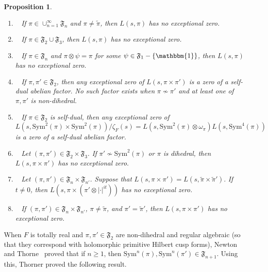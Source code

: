 \documentclass[11pt]{amsart}
\newtheorem{proposition}[theorem]{Proposition}
\theoremstyle{remark}
\newcommand{\Sym}{\mathrm{Sym}}
\renewcommand{\tilde}{\widetilde}
\numberwithin{equation}{section}
\begin{document}
\begin{proposition}
\label{prop:list}
\begin{enumerate}[leftmargin=*]
	\item~\cite{HoffsteinRamakrishnan,Wattanawanichkul} If $\pi\in\cup_{n=1}^{\infty}\mathfrak{F}_{n}$ and $\pi\neq \tilde{\pi}$, then $L(s,\pi)$ has no exceptional zero.
	\item~\cite{Banks,HoffsteinRamakrishnan} If $\pi\in\mathfrak{F}_{2}\cup \mathfrak{F}_{3}$, then $L(s,\pi)$ has no exceptional zero.
	\item~\cite{Luo} If $\pi\in\mathfrak{F}_n$ and $\pi\otimes\psi=\pi$ for some $\psi\in\mathfrak{F}_1-\{\mathbbm{1}\}$, then $L(s,\pi)$ has no exceptional zero.
	\item~\cite{RamakrishnanWang} If $\pi,\pi'\in\mathfrak{F}_{2}$, then any exceptional zero of $L(s,\pi\times\pi')$ is a zero of a self-dual abelian factor.  No such factor exists when $\pi\not\sim\pi'$ and at least one of $\pi,\pi'$ is non-dihedral.
	\item~\cite{RamakrishnanWang} If $\pi\in\mathfrak{F}_{2}$ is self-dual, then any exceptional zero of $L(s,\mathrm{Sym}^2(\pi)\times\mathrm{Sym}^2(\pi))/\zeta_F(s)=L(s,\mathrm{Sym}^2(\pi)\otimes\omega_{\pi})L(s,\mathrm{Sym}^4(\pi))$ is a zero of a self-dual abelian factor.
	\item~\cite{Luo} Let $(\pi,\pi')\in\mathfrak{F}_2\times\mathfrak{F}_3$.  If $\pi'\not\sim\Sym^2(\pi)$ or $\pi$ is dihedral, then $L(s,\pi\times\pi')$ has no exceptional zero.
	\item~\cite{HumphriesThorner,Wattanawanichkul} Let $(\pi,\pi')\in\mathfrak{F}_n\times\mathfrak{F}_{n'}$.  Suppose that $L(s,\pi\times\pi')=L(s,\tilde{\pi}\times\tilde{\pi}')$.  If $t\neq 0$, then $L(s,\pi\times(\pi'\otimes|\cdot|^{it}))$ has no exceptional zero.
	\item~\cite{Humphries,Wattanawanichkul} If $(\pi,\pi')\in\mathfrak{F}_n\times\mathfrak{F}_{n'}$, $\pi\neq\tilde{\pi}$, and $\pi'=\tilde{\pi}'$, then $L(s,\pi\times\pi')$ has no exceptional zero.
\end{enumerate}
\end{proposition}




When $F$ is totally real and $\pi,\pi'\in\mathfrak{F}_2$ are non-dihedral and regular algebraic (so that they correspond with holomorphic primitive Hilbert cusp forms), Newton and Thorne~\cite{NewtonThorne3,NewtonThorne,NewtonThorne2} proved that if $n\geq 1$, then $\Sym^n(\pi),\Sym^n(\pi')\in\mathfrak{F}_{n+1}$.  Using this, Thorner proved the following result.
\end{document}
